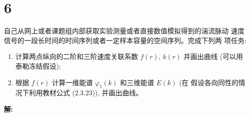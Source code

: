 \documentclass[12pt,a4]{ctexart}
\begin{document}
\section{6}

自己从网上或者课题组内部获取实验测量或者直接数值模拟得到的湍流脉动 速度信号的一段长时间的时间序列或者一定样本容量的空间序列。完成下列两 项任务:
\begin{enumerate}
   \item 计算两点纵向的二阶和三阶速度关联系数 $f(r),\, k(r)$ 并画出曲线 (可以用泰勒冻结假设);
   \item 根据 $f(r)$ 计算一维能谱 $\varphi_{1}(k)$ 和三维能谱 $E(k)$ (在 假设各向同性的情况下利用教材公式 (2.3.23)), 并画出曲线。
\end{enumerate}

\textsf{\hspace{-2em}\sf  \textbf{解:}}
\end{document}
